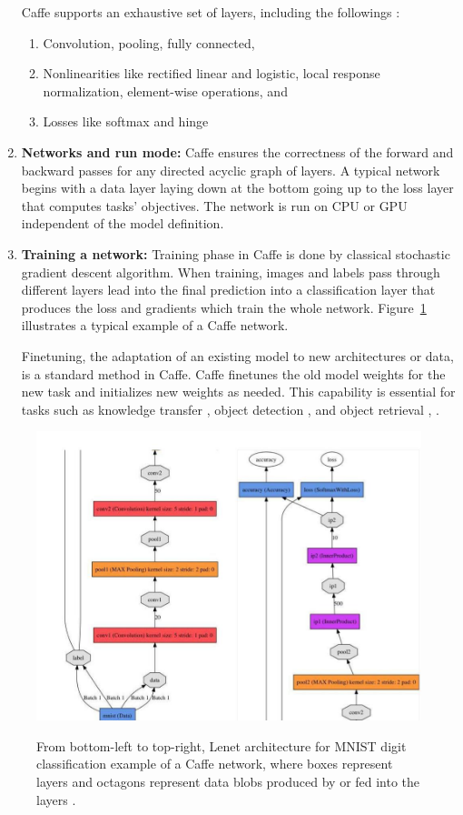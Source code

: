 \begin{enumerate}
\indent Caffe supports an exhaustive set of layers, including the followings \cite{jia2014caffe}: 
\begin{enumerate}
	\item Convolution, pooling, fully connected, 
	\item Nonlinearities like rectified
	linear and logistic, local response normalization, element-wise operations, and 
	\item Losses like softmax and hinge
\end{enumerate}
\item \textbf{Networks and run mode:} Caffe ensures the correctness of the forward and backward passes for any directed acyclic graph of layers. A typical network begins with a data layer laying down at the bottom going up to the loss layer that computes tasks' objectives. The network is run on CPU or GPU independent of the model definition. 
\item \textbf{Training a network:} Training phase in Caffe is done by classical stochastic gradient descent algorithm. When training, images and labels pass through different layers lead into the final prediction into a classification layer that produces the loss and gradients which train the whole network. Figure~\ref{fig:caffe} illustrates a typical example of a Caffe network. 


\indent Finetuning, the adaptation of an existing model to new architectures or data, is a standard method in Caffe. Caffe  finetunes the old model weights for the new task and initializes new weights as needed. This capability is essential for tasks such as knowledge transfer \cite{donahue2013decaf}, object detection \cite{girshick2014rich}, and object retrieval \cite{guadarrama2014open}, \cite{jia2014caffe}.  
\end{enumerate}


\begin{figure}[H]
	\centering
	{\includegraphics[width=1.\textwidth]{images/le2col}}
	\caption{From bottom-left to top-right, Lenet architecture for MNIST digit classification example of a Caffe network, where boxes represent layers and octagons represent data blobs produced by or fed into the layers \cite{jia2014caffe}.}
	\label{fig:caffe}
\end{figure}

